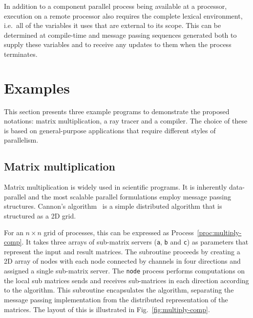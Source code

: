 \documentclass[11pt, conference, compsocconf, onecolumn]{IEEEtran}
\newcommand{\ttt}[1]{\texttt{#1}}
\newcommand{\fig}[1]{Fig.~\ref{fig:#1}}
\newcommand{\proc}[1]{Process~\ref{proc:#1}}
\newcounter{process}
\begin{document}
In addition to a component parallel process being available at a processor,
execution on a remote processor also requires the complete lexical environment,
i.e.\ all of the variables it uses that are external to its scope. This can be
determined at compile-time and message passing sequences generated both to
supply these variables and to receive any updates to them when the process
terminates. 

\section{Examples\label{sec:examples}}

This section presents three example programs to demonstrate the proposed
notations: matrix multiplication, a ray tracer and a compiler. The choice of
these is based on general-purpose applications that require different styles of
parallelism.

\subsection{Matrix multiplication\label{sec:matrix-multiply}}

Matrix multiplication is widely used in scientific programs. It is inherently
data-parallel and the most scalable parallel formulations employ message
passing structures.  Cannon's algorithm~\cite{Cannon69} is a simple distributed
algorithm that is structured as a 2D grid.

For an $n\times n$ grid of processes, this can be expressed as
\proc{multiply-comp}.  It takes three arrays of sub-matrix servers (\ttt{a},
\ttt{b} and \ttt{c}) as parameters that represent the input and result
matrices. The subroutine proceeds by creating a 2D array of nodes with each
node connected by channels in four directions and assigned a single sub-matrix
server.  The \ttt{node} process performs computations on the local sub matrices
sends and receives sub-matrices in each direction according to the algorithm.
This subroutine encapsulates the algorithm, separating the message passing
implementation from the distributed representation of the matrices. The layout
of this is illustrated in \fig{multiply-comp}. 
\end{document}
